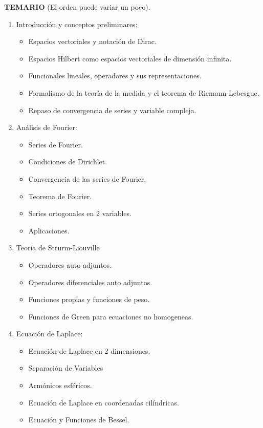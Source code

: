 \documentclass[letterpaper]{article}
\begin{document}
\noindent \textbf{TEMARIO} (El orden puede variar un poco).

\begin{enumerate}
\item Introducción y conceptos preliminares:
\begin{itemize}
\item Espacios vectoriales y notación de Dirac.
\item Espacios Hilbert como espacios vectoriales de dimensión infinita.
\item Funcionales lineales, operadores y sus representaciones.
\item Formalismo de la teoría de la medida y el teorema de Riemann-Lebesgue.
\item Repaso de convergencia de series y variable compleja.
\end{itemize}

\item Análisis de Fourier:
\begin{itemize}
\item Series de Fourier.
\item Condiciones de Dirichlet.
\item Convergencia de las series de Fourier.
\item Teorema de Fourier.
\item Series ortogonales en 2 variables.
\item Aplicaciones.
\end{itemize}

\item Teoría de Strurm-Liouville
\begin{itemize}
\item Operadores auto adjuntos.
\item Operadores diferenciales auto adjuntos.
\item Funciones propias y funciones de peso.
\item Funciones de Green para ecuaciones no homogeneas.
\end{itemize}

\item Ecuación de Laplace:
\begin{itemize}
\item Ecuación de Laplace en 2 dimensiones.
\item Separación de Variables
\item Armónicos esféricos.
\item Ecuación de Laplace en coordenadas cilíndricas.
\item Ecuación y Funciones de Bessel.
\end{itemize}


\end{enumerate}
\end{document}
